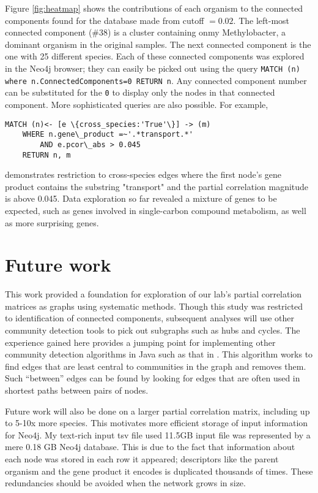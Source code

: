 \documentclass[12pt]{article}
\begin{document}
Figure \ref{fig:heatmap} shows the contributions of each organism to the connected components found for the database made from cutoff $= 0.02$.
The left-most connected component (\#38) is a cluster containing onmy Methylobacter, a dominant organism in the original samples. 
The next connected component is the one with 25 different species. 
Each of these connected components was explored in the Neo4j browser; they can easily be picked out using the query
\texttt{MATCH (n) where n.ConnectedComponents=0 RETURN n}.  
Any connected component number can be substituted for the \texttt{0} to display only the nodes in that connected component. 
More sophisticated queries are also possible. 
For example, %
\begin{verbatim} 
MATCH (n)<- [e \{cross_species:'True'\}] -> (m) 
    WHERE n.gene\_product =~'.*transport.*' 
        AND e.pcor\_abs > 0.045 
    RETURN n, m \end{verbatim}
demonstrates restriction to cross-species edges where the first node's gene product contains the substring "transport" and the partial correlation magnitude is above 0.045.
Data exploration so far revealed a mixture of genes to be expected, such as genes involved in single-carbon compound metabolism, as well as more surprising genes. 

\section{Future work}

This work provided a foundation for exploration of our lab's partial correlation matrices as graphs using systematic methods.
Though this study was restricted to identification of connected components, subsequent analyses will use other community detection tools to pick out subgraphs such as hubs and cycles.
The experience gained here provides a jumping point for implementing other community detection algorithms in Java such as that in \cite{girvan2002community}.
This algorithm works to find edges that are least central to communities in the graph and removes them.
Such ``between'' edges can be found by looking for edges that are often used in shortest paths between pairs of nodes.

Future work will also be done on a larger partial correlation matrix, including up to 5-10x more species.  
This motivates more efficient storage of input information for Neo4j. 
My text-rich input tsv file used 11.5GB input file was represented by a mere 0.18 GB Neo4j database.
This is due to the fact that information about each node was stored in each row it appeared;  descriptors like the parent organism and the gene product it encodes is duplicated thousands of times.
These redundancies should be avoided when the network grows in size. 
\end{document}
